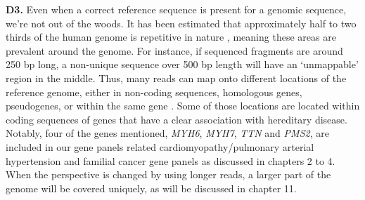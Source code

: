 \textbf{D3.} Even when a correct reference sequence is present for a genomic sequence, we’re not out of the woods. 
It has been estimated that approximately half to two thirds of the human genome is repetitive in nature \cite{de_Koning_2011}, meaning these areas are prevalent around the genome. 
For instance, if sequenced fragments are around 250 bp long, a non-unique sequence over 500 bp length will have an ‘unmappable’ region in the middle. 
Thus, many reads can map onto different locations of the reference genome, either in non-coding sequences, homologous genes, pseudogenes, or within the same gene \cite{Mandelker_2016}. 
Some of those locations are located within coding sequences of genes that have a clear association with hereditary disease. 
Notably, four of the genes mentioned, \textsl{MYH6}, \textsl{MYH7}, \textsl{TTN} and \textsl{PMS2}, are included in our gene panels related cardiomyopathy/pulmonary arterial hypertension and familial cancer gene panels as discussed in chapters 2 to 4.
When the perspective is changed by using longer reads, a larger part of the genome will be covered uniquely, as will be discussed in chapter 11. 

